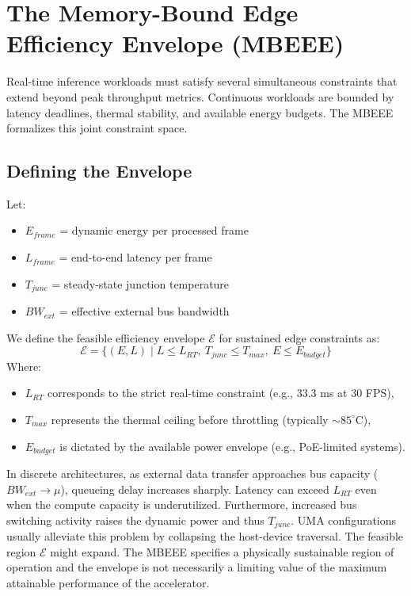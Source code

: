 \documentclass[conference]{IEEEtran}
\begin{document}
\section{The Memory-Bound Edge Efficiency Envelope (MBEEE)}

Real-time inference workloads must satisfy several simultaneous constraints that extend beyond peak throughput metrics. Continuous workloads are bounded by latency deadlines, thermal stability, and available energy budgets. The MBEEE formalizes this joint constraint space.

\subsection{Defining the Envelope}
Let:
\begin{itemize}
    \item $E_{frame}$ = dynamic energy per processed frame
    \item $L_{frame}$ = end-to-end latency per frame
    \item $T_{junc}$ = steady-state junction temperature
    \item $BW_{ext}$ = effective external bus bandwidth
\end{itemize}

We define the feasible efficiency envelope $\mathcal{E}$ for sustained edge constraints as:
\begin{equation}
\mathcal{E} = \{ (E, L) \mid L \le L_{RT},\ T_{junc} \le T_{max},\ E \le E_{budget} \}
\end{equation}
Where:
\begin{itemize}
    \item $L_{RT}$ corresponds to the strict real-time constraint (e.g., $33.3$ ms at 30 FPS),
    \item $T_{max}$ represents the thermal ceiling before throttling (typically $\sim 85^\circ$C),
    \item $E_{budget}$ is dictated by the available power envelope (e.g., PoE-limited systems).
\end{itemize}

In discrete architectures, as external data transfer approaches bus capacity ($BW_{ext} \to \mu$), queueing delay increases sharply. Latency can exceed $L_{RT}$ even when the compute capacity is underutilized. Furthermore, increased bus switching activity raises the dynamic power and thus $T_{junc}$. UMA configurations usually alleviate this problem by collapsing the host-device traversal. The feasible region $\mathcal{E}$ might expand. The MBEEE specifies a physically sustainable region of operation and the envelope is not necessarily a limiting value of the maximum attainable performance of the accelerator.
\end{document}
